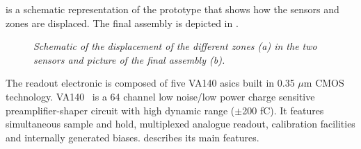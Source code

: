  is a schematic representation of the prototype that
shows how the sensors and zones are displaced. The final assembly is depicted in
.
\begin{figure}[!htb]
\centering
{}
\caption{\small \it Schematic of the displacement of the different zones (a) in the
  two sensors and picture of the final assembly (b).}\label{fig:basculo}
\end{figure}

The readout electronic is composed of five VA140 \gls{asic}s built in 0.35
$\mu$m CMOS technology. VA140~\cite{va140} is a 64 channel low noise/low power charge
sensitive preamplifier-shaper circuit with high dynamic range ($\pm$200 fC). It
features simultaneous sample and hold, multiplexed analogue readout, calibration
facilities and internally generated biases.  describes its
main features.\\

